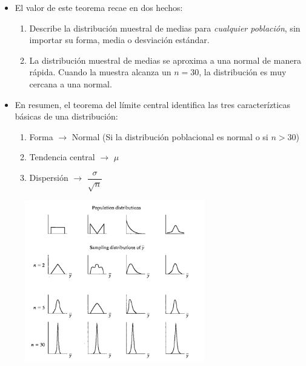 \documentclass{beamer}
\begin{document}
\begin{frame}
\begin{itemize}
\justifying
\item El valor de este teorema recae en dos hechos:
\begin{enumerate}
	\justifying
	\item Describe la distribución muestral de medias para \emph{cualquier población}, sin importar su forma, media o desviación estándar.
	\item La distribución muestral de medias 	se aproxima a una normal de manera rápida. Cuando la muestra alcanza un $n=30$, la distribución es muy cercana a una normal.
\end{enumerate}
\item En resumen, el teorema del límite central identifica las tres caracterízticas básicas de una distribución: 
\begin{enumerate}[I]
\item Forma $\rightarrow$ Normal (Si la distribución poblacional es normal o si $n>30$)
\item Tendencia central $\rightarrow$ $\mu$
\item Dispersión $\rightarrow$ $\dfrac{\sigma}{\sqrt{n}}$
\end{enumerate}
\end{itemize}
\end{frame}

\begin{frame}
					\begin{figure}[H]
						\centering  
						\caption{} 
						\includegraphics[width = 0.7\textwidth]{./cap5}
					\end{figure}
\end{frame}
\end{document}

